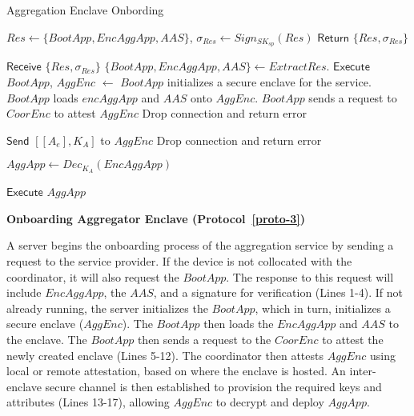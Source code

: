 \begin{algorithm}[t]
\small
\caption{Aggregation Enclave Onbording}
\label{proto-3}
\begin{algorithmic}[1]
\item[]

\begin{center}
\end{center}

\STATE $Res \gets \{BootApp,EncAggApp, AAS\}$, $\sigma_{Res}\gets Sign_{SK_{sp}}(Res)$
\STATE $\mathsf{Return}$ $\{Res,\sigma_{Res}\}$


\begin{center}
\end{center}

\STATE $\mathsf{Receive}$  $\{Res,\sigma_{Res}\}$
\STATE  $\{BootApp,EncAggApp, AAS\} \gets Extract Res$.
    \STATE $\mathsf{Execute}$ $BootApp$, 
    \STATE $AggEnc$ $\leftarrow$ $BootApp$ initializes a secure enclave for the service.
    \STATE $BootApp$ loads $encAggApp$ and $AAS$ onto $AggEnc$.
    \STATE $BootApp$ sends a request to $CoorEnc$ to attest $AggEnc$
\ELSE
    \STATE Drop connection and return error 
\ENDIF
\begin{center}
\end{center}
    \STATE $\mathsf{Send}$ $[[A_e], {K_A}]$ to $AggEnc$
\ELSE
    \STATE Drop connection and return error 
\ENDIF

\begin{center}
\end{center}

\STATE $AggApp \gets {Dec}_{K_A}(EncAggApp)$

\State $\mathsf{Execute}$ $AggApp$

\end{algorithmic}
\end{algorithm}



\noindent
{\bf Onboarding Aggregator Enclave (Protocol~\ref{proto-3})}

\noindent
A server begins the onboarding process of the aggregation service by sending a request to the service provider. If the device is not collocated with the coordinator, it will also request the $BootApp$. The response to this request will include $EncAggApp$, the $AAS$, and a signature for verification (Lines 1-4). If not already running, the server initializes the $BootApp$, which in turn, initializes a secure enclave ($AggEnc$). The $BootApp$ then loads the $EncAggApp$ and $AAS$ to the enclave. The $BootApp$ then sends a request to the $CoorEnc$ to attest the newly created enclave (Lines 5-12).
The coordinator then attests $AggEnc$ using local or remote attestation, based on where the enclave is hosted. An inter-enclave secure channel is then established to provision the required keys and attributes (Lines 13-17), allowing $AggEnc$ to decrypt and deploy $AggApp$. 
\bigskip

